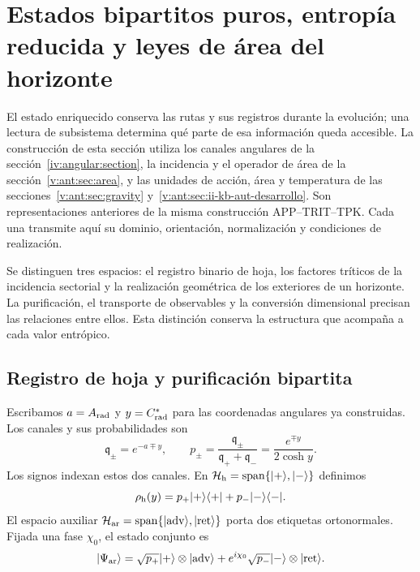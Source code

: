 
\section{Estados bipartitos puros, entropía reducida y leyes de área del horizonte}
\label{vii:sec:horizontes-informacion}

El estado enriquecido conserva las rutas y sus registros durante la
evolución; una lectura de subsistema determina qué parte de esa información
queda accesible. La construcción de esta sección utiliza los canales
angulares de la sección~\ref{iv:angular:section}, la incidencia y el
operador de área de la sección~\ref{v:ant:sec:area}, y las unidades
de acción, área y temperatura de las
secciones~\ref{v:ant:sec:gravity}
y~\ref{v:ant:sec:ii-kb-aut-desarrollo}. Son representaciones anteriores de la
misma construcción APP--TRIT--TPK. Cada una transmite aquí su dominio,
orientación, normalización y condiciones de realización.

Se distinguen tres espacios: el registro binario de hoja, los factores
tríticos de la incidencia sectorial y la realización geométrica de los
exteriores de un horizonte. La purificación, el transporte de observables
y la conversión dimensional precisan las relaciones entre ellos. Esta
distinción conserva la estructura que acompaña a cada valor entrópico.

\subsection{Registro de hoja y purificación bipartita}
\label{vii:subsec:hojas-purificacion}

Escribamos \(a=A_{\rm rad}\) y \(y=C^*_{\rm rad}\) para las
coordenadas angulares ya construidas. Los canales y sus probabilidades son
\begin{equation}
 \mathfrak q_\pm=e^{-a\mp y},\qquad
 p_\pm=\frac{\mathfrak q_\pm}{\mathfrak q_++\mathfrak q_-}
       =\frac{e^{\mp y}}{2\cosh y}.
 \label{vii:eq:probabilidades-hoja}
\end{equation}
Los signos indexan estos dos canales. En
\(\mathcal H_{\rm h}=\operatorname{span}\{|+\rangle,|-\rangle\}\)
definimos
\[
 \rho_{\rm h}(y)=p_+|+\rangle\langle+|+p_-|-\rangle\langle-|.
\]
El espacio auxiliar
\(\mathcal H_{\rm ar}=\operatorname{span}
\{|\mathrm{adv}\rangle,|\mathrm{ret}\rangle\}\)
porta dos etiquetas ortonormales. Fijada una fase \(\chi_0\), el estado
conjunto es
\begin{equation}
 |\Psi_{\rm ar}\rangle
 =\sqrt{p_+}|+\rangle\otimes|\mathrm{adv}\rangle
  +e^{i\chi_0}\sqrt{p_-}|-\rangle\otimes|\mathrm{ret}\rangle.
 \label{vii:eq:purificacion-hoja}
\end{equation}

